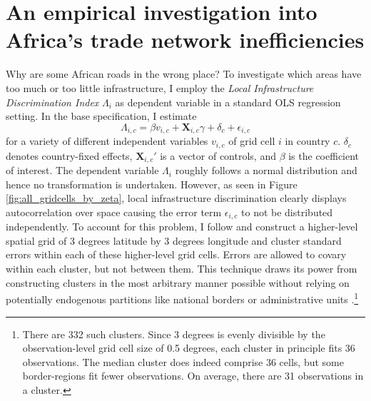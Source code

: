 \documentclass[11pt, oneside]{article}   	%
\begin{document}
\section{An empirical investigation into Africa's trade network inefficiencies}
\label{chap:results}
Why are some African roads in the wrong place? To investigate which areas have too much or too little infrastructure, I employ the \emph{Local Infrastructure Discrimination Index} $\Lambda_{i}$ as dependent variable in a standard OLS regression setting. In the base specification, I estimate
\begin{equation}
  \Lambda_{i,c} = \beta v_{i,c} + \textbf{X}_{i,c}\gamma + \delta_{c} + \epsilon_{i,c}
  \label{eq:grid_ols}
\end{equation}
for a variety of different independent variables $v_{i,c}$ of grid cell $i$ in country $c$. $\delta_{c}$ denotes country-fixed effects, $\textbf{X}_{i,c}'$ is a vector of controls, and $\beta$ is the coefficient of interest. The dependent variable $\Lambda_{i}$ roughly follows a normal distribution and hence no transformation is undertaken. However, as seen in Figure \eqref{fig:all_gridcells_by_zeta}, local infrastructure discrimination clearly displays autocorrelation over space causing the error term $\epsilon_{i,c}$ to not be distributed independently. To account for this problem, I follow \cite{Bester_Inferencedependentdata_2011} and construct a higher-level spatial grid of 3 degrees latitude by 3 degrees longitude and cluster standard errors within each of these higher-level grid cells. Errors are  allowed to covary within each cluster, but not between them. This technique draws its power from constructing clusters in the most arbitrary manner possible without relying on potentially endogenous partitions like national borders or administrative units \citep[see e.g.][]{michaels_resetting_2017}.\footnote{There are 332 such clusters. Since 3 degrees is evenly divisible by the observation-level grid cell size of 0.5 degrees, each cluster in principle fits 36 observations. The median cluster does indeed comprise 36 cells, but some border-regions fit fewer observations. On average, there are 31 observations in a cluster.}
\end{document}
